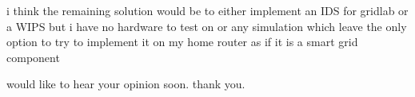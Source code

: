 \documentclass{masterthesis-uc2-en}
\begin{document}
	i think the remaining solution would be to either implement an IDS for gridlab or a WIPS but i have no hardware to test on or any simulation which leave the only option to try to implement it on my home router as if it is a smart grid component

	would like to hear your opinion soon. thank you.



	
	

\mainmatter

\backmatter
\end{document}
